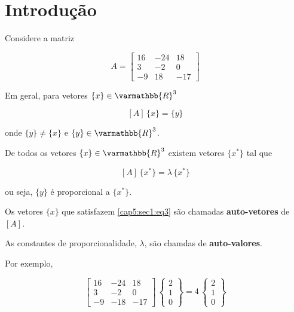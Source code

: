 \section{Introdução}

Considere a matriz

\begin{equation}
\label{cap5:sec1:eq1}
 A =
 \left[
 \begin{array}{rrr}
  16 & -24 & 18\\
  3  & -2  & 0\\
  -9 & 18  & -17
 \end{array}
 \right]
\end{equation}

Em geral, para vetores $ \{x\} \in \varmathbb{R}^3 $

\begin{equation}
\label{cap5:sec1:eq2}
[A] \, \{x\} = \{y\}
\end{equation}

onde $ \{y\} \neq \{x\} $ e $ \{y\} \in \varmathbb{R}^3 $.

De todos os vetores $ \{x\} \in \varmathbb{R}^3 $ existem vetores $ \{x^*\} $ tal que

\begin{equation}
\label{cap5:sec1:eq3}
[A] \, \{x^*\} = \lambda \, \{x^*\}
\end{equation}

ou seja, $ \{y\} $ é proporcional a $ \{x^*\} $.

\begin{definicao}
Os vetores $ \{x\} $ que satisfazem \ref{cap5:sec1:eq3} são chamadas \textbf{auto-vetores} de $[A]$.
\end{definicao}

\begin{definicao}
As constantes de proporcionalidade, $ \lambda $, são chamdas de \textbf{auto-valores}.
\end{definicao}

Por exemplo,

\begin{equation}
\label{cap5:sec1:eq4}
 \left[
  \begin{array}{rrr}
   16 & -24 & 18\\
   3  & -2  & 0\\
   -9 & -18 & -17
  \end{array}
 \right]
 \,
 \left\{
  \begin{array}{c}
   2\\
   1\\
   0
  \end{array}
 \right\}
 =
 4 \,
 \left\{
  \begin{array}{c}
   2\\
   1\\
   0
  \end{array}
 \right\}
\end{equation}

